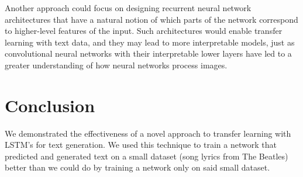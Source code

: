 \documentclass[10pt,twocolumn,letterpaper]{article}
\begin{document}
	Another approach could focus on designing recurrent neural network architectures that have a natural notion of which parts of the network correspond to higher-level features of the input. Such architectures would enable transfer learning with text data, and they may lead to more interpretable models, just as convolutional neural networks with their interpretable lower layers have led to a greater understanding of how neural networks process images.

\section{Conclusion}
	We demonstrated the effectiveness of a novel approach to transfer learning with LSTM's for text generation. We used this technique to train a network that predicted and generated text on a small dataset (song lyrics from The Beatles) better than we could do by training a network only on said small dataset.

{\small


}
\end{document}
